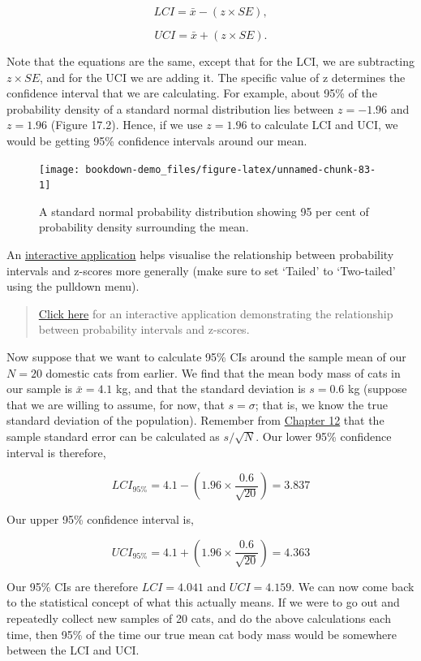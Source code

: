 \documentclass[
]{scrbook}
\begin{document}
\[LCI = \bar{x} - (z \times SE),\]

\[UCI = \bar{x} + (z \times SE).\]

Note that the equations are the same, except that for the LCI, we are subtracting \(z \times SE\), and for the UCI we are adding it.
The specific value of z determines the confidence interval that we are calculating.
For example, about 95\% of the probability density of a standard normal distribution lies between \(z = -1.96\) and \(z = 1.96\) (Figure 17.2).
Hence, if we use \(z = 1.96\) to calculate LCI and UCI, we would be getting 95\% confidence intervals around our mean.

\begin{figure}
\texttt{[image: bookdown-demo\_files/figure-latex/unnamed-chunk-83-1]} \caption{A standard normal probability distribution showing 95 per cent of probability density surrounding the mean.}\label{fig:unnamed-chunk-83}
\end{figure}

An \href{https://bradduthie.shinyapps.io/zandp/}{interactive application} helps visualise the relationship between probability intervals and z-scores more generally (make sure to set `Tailed' to `Two-tailed' using the pulldown menu).

\begin{quote}
\href{https://bradduthie.shinyapps.io/zandp/}{Click here} for an interactive application demonstrating the relationship between probability intervals and z-scores.
\end{quote}

Now suppose that we want to calculate 95\% CIs around the sample mean of our \(N = 20\) domestic cats from earlier.
We find that the mean body mass of cats in our sample is \(\bar{x} = 4.1\) kg, and that the standard deviation is \(s = 0.6\) kg (suppose that we are willing to assume, for now, that \(s = \sigma\); that is, we know the true standard deviation of the population).
Remember from \protect\hyperlink{Chapter_12}{Chapter 12} that the sample standard error can be calculated as \(s / \sqrt{N}\).
Our lower 95\% confidence interval is therefore,

\[LCI_{95\%} = 4.1 - \left(1.96 \times \frac{0.6}{\sqrt{20}}\right) = 3.837\]

Our upper 95\% confidence interval is,

\[UCI_{95\%} = 4.1 + \left(1.96 \times \frac{0.6}{\sqrt{20}}\right) = 4.363\]

Our 95\% CIs are therefore \(LCI = 4.041\) and \(UCI = 4.159\).
We can now come back to the statistical concept of what this actually means.
If we were to go out and repeatedly collect new samples of 20 cats, and do the above calculations each time, then 95\% of the time our true mean cat body mass would be somewhere between the LCI and UCI.
\end{document}
